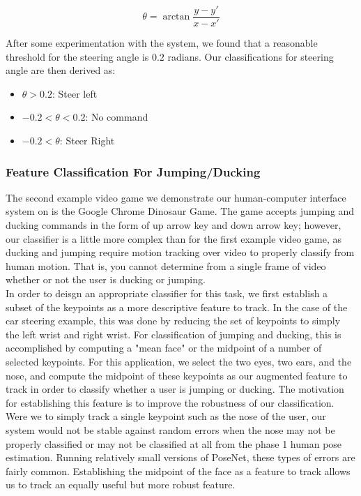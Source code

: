 \documentclass[10pt,twocolumn,letterpaper]{article}
\begin{document}
$$\theta = \arctan{\frac{y-y'}{x-x'}}$$

After some experimentation with the system, we found that a reasonable threshold 
for the steering angle is $0.2$ radians. Our classifications for steering angle 
are then derived as:

\begin{itemize}
    \item $\theta > 0.2$: Steer left
    \item $-0.2 < \theta < 0.2$: No command
    \item $-0.2 < \theta$: Steer Right
\end{itemize}

\subsubsection{Feature Classification For Jumping/Ducking} 
The second example video game we demonstrate our human-computer interface system 
on is the Google Chrome Dinosaur Game. The game accepts jumping and ducking commands 
in the form of up arrow key and down arrow key; however, our classifier is a 
little more complex than for the first example video game, as ducking and jumping 
require motion tracking over video to properly classify from human motion. That is, 
you cannot determine from a single frame of video whether or not the user is 
ducking or jumping.\\

In order to deisgn an appropriate classifier for this task, we first establish 
a subset of the keypoints as a more descriptive feature to track. In the case of 
the car steering example, this was done by reducing the set of keypoints to simply 
the left wrist and right wrist. For classification of jumping and ducking, this is 
accomplished by computing a "mean face" or the midpoint of a number of selected 
keypoints. For this application, we select the two eyes, two ears, and the nose, 
and compute the midpoint of these keypoints as our augmented feature to track in 
order to classify whether a user is jumping or ducking. The motivation for establishing 
this feature is to improve the robustness of our classification. Were we to simply 
track a single keypoint such as the nose of the user, our system would not be 
stable against random errors when the nose may not be properly classified or 
may not be classified at all from the phase 1 human pose estimation. Running 
relatively small versions of PoseNet, these types of errors are fairly common. 
Establishing the midpoint of the face as a feature to track allows us to track 
an equally useful but more robust feature.\\
\end{document}

